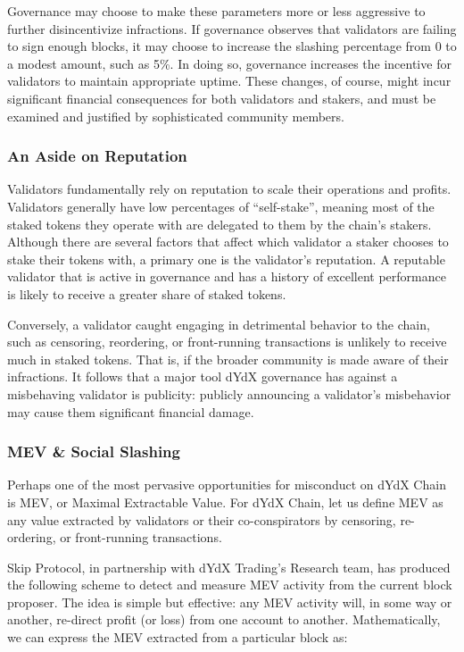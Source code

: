             Governance may choose to make these parameters more or less aggressive to further disincentivize infractions. If governance observes that validators are failing to sign enough blocks, it may choose to increase the slashing percentage from 0 to a modest amount, such as 5\%. In doing so, governance increases the incentive for validators to maintain appropriate uptime. These changes, of course, might incur significant financial consequences for both validators and stakers, and must be examined and justified by sophisticated community members.

        \subsubsection{An Aside on Reputation}

            Validators fundamentally rely on reputation to scale their operations and profits. Validators generally have low percentages of ``self-stake'', meaning most of the staked tokens they operate with are delegated to them by the chain's stakers. Although there are several factors that affect which validator a staker chooses to stake their tokens with, a primary one is the validator's reputation. A reputable validator that is active in governance and has a history of excellent performance is likely to receive a greater share of staked tokens. 

            Conversely, a validator caught engaging in detrimental behavior to the chain, such as censoring, reordering, or front-running transactions is unlikely to receive much in staked tokens. That is, if the broader community is made aware of their infractions. It follows that a major tool dYdX governance has against a misbehaving validator is publicity: publicly announcing a validator's misbehavior may cause them significant financial damage. 

        \subsubsection{MEV \& Social Slashing}

            Perhaps one of the most pervasive opportunities for misconduct on dYdX Chain is MEV, or Maximal Extractable Value. For dYdX Chain, let us define MEV as any value extracted by validators or their co-conspirators by censoring, re-ordering, or front-running transactions. 

            Skip Protocol, in partnership with dYdX Trading's Research team, has produced the following scheme to detect and measure MEV activity from the current block proposer. The idea is simple but effective: any MEV activity will, in some way or another, re-direct profit (or loss) from one account to another. Mathematically, we can express the MEV extracted from a particular block as:

